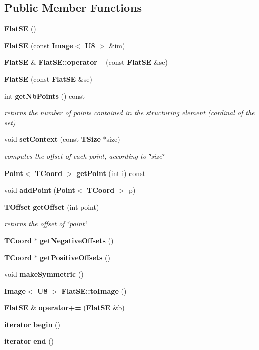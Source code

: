 \subsection*{Public Member Functions}
\begin{CompactItemize}
\item 
{\bf Flat\-SE} ()
\item 
{\bf Flat\-SE} (const {\bf Image}$<$ {\bf U8} $>$ \&im)
\item 
{\bf Flat\-SE} \& {\bf Flat\-SE::operator=} (const {\bf Flat\-SE} \&se)
\item 
{\bf Flat\-SE} (const {\bf Flat\-SE} \&se)
\item 
int {\bf get\-Nb\-Points} () const 
\begin{CompactList}\small\item\em returns the number of points contained in the structuring element (cardinal of the set) \item\end{CompactList}\item 
void {\bf set\-Context} (const {\bf TSize} $\ast$size)
\begin{CompactList}\small\item\em computes the offset of each point, according to \char`\"{}size\char`\"{} \item\end{CompactList}\item 
{\bf Point}$<$ {\bf TCoord} $>$ {\bf get\-Point} (int i) const 
\item 
void {\bf add\-Point} ({\bf Point}$<$ {\bf TCoord} $>$ p)
\item 
{\bf TOffset} {\bf get\-Offset} (int point)
\begin{CompactList}\small\item\em returns the offset of \char`\"{}point\char`\"{} \item\end{CompactList}\item 
{\bf TCoord} $\ast$ {\bf get\-Negative\-Offsets} ()
\item 
{\bf TCoord} $\ast$ {\bf get\-Positive\-Offsets} ()
\item 
void {\bf make\-Symmetric} ()
\item 
{\bf Image}$<$ {\bf U8} $>$ {\bf Flat\-SE::to\-Image} ()
\item 
{\bf Flat\-SE} \& {\bf operator+=} ({\bf Flat\-SE} \&b)
\item 
{\bf iterator} {\bf begin} ()
\item 
{\bf iterator} {\bf end} ()

\end{CompactItemize}
